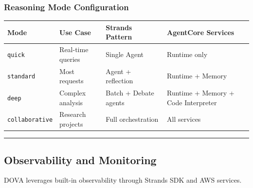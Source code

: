 \subsubsection{Reasoning Mode
Configuration}\label{reasoning-mode-configuration}

{\def\LTcaptype{none} %
\begin{longtable}[]{@{}
  >{\raggedright\arraybackslash}p{}
  >{\raggedright\arraybackslash}p{}
  >{\raggedright\arraybackslash}p{}
  >{\raggedright\arraybackslash}p{}@{}}
\toprule\noalign{}
\begin{minipage}[b]{\linewidth}\raggedright
Mode
\end{minipage} & \begin{minipage}[b]{\linewidth}\raggedright
Use Case
\end{minipage} & \begin{minipage}[b]{\linewidth}\raggedright
Strands Pattern
\end{minipage} & \begin{minipage}[b]{\linewidth}\raggedright
AgentCore Services
\end{minipage} \\
\midrule\noalign{}
\endhead
\bottomrule\noalign{}
\endlastfoot
\texttt{quick} & Real-time queries & Single Agent & Runtime only \\
\texttt{standard} & Most requests & Agent + reflection & Runtime +
Memory \\
\texttt{deep} & Complex analysis & Batch + Debate agents & Runtime +
Memory + Code Interpreter \\
\texttt{collaborative} & Research projects & Full orchestration & All
services \\
\end{longtable}
}

\begin{center}\rule{0.5\linewidth}{0.5pt}\end{center}

\subsection{Observability and
Monitoring}\label{observability-and-monitoring}

DOVA leverages built-in observability through Strands SDK and AWS
services.


